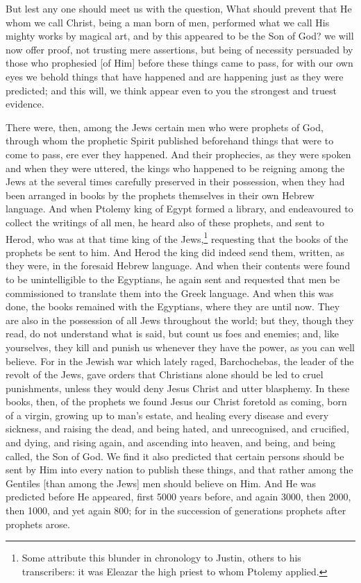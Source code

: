 
But lest any one should meet us with the question, What should prevent that He whom we call Christ, being a man born of men, performed what we call His mighty works by magical art, and by this appeared to be the Son of God? we will now offer proof, not trusting mere assertions, but being of necessity persuaded by those who prophesied [of Him] before these things came to pass, for with our own eyes we behold things that have happened and are happening just as  they were predicted; and this will, we think appear even to you the strongest and truest evidence.


There were, then, among the Jews certain men who were prophets of God, through whom the prophetic Spirit published beforehand things that were to come to pass, ere ever they happened. And their prophecies, as they were spoken and when they were uttered, the kings who happened to be reigning among the Jews at the several times carefully preserved in their possession, when they had been arranged in books by the prophets themselves in their own Hebrew language. And when Ptolemy king of Egypt formed a library, and endeavoured to collect the writings of all men, he heard also of these prophets, and sent to Herod, who was at that time king of the Jews,\footnote{Some attribute this blunder in chronology to Justin, others to his transcribers: it was Eleazar the high priest to whom Ptolemy applied.} requesting that the books of the prophets be sent to him. And Herod the king did indeed send them, written, as they were, in the foresaid Hebrew language. And when their contents were found to be unintelligible to the Egyptians, he again sent and requested that men be commissioned to translate them into the Greek language. And when this was done, the books remained with the Egyptians, where they are until now. They are also in the possession of all Jews throughout the world; but they, though they read, do not understand what is said, but count us foes and enemies; and, like yourselves, they kill and punish us whenever they have the power, as you can well believe. For in the Jewish war which lately raged, Barchochebas, the leader of the revolt of the Jews, gave orders that Christians alone should be led to cruel punishments, unless they would deny Jesus Christ and utter blasphemy. In these books, then, of the prophets we found Jesus our Christ foretold as coming, born of a virgin, growing up to man’s estate, and healing every disease and every sickness, and raising the dead, and being hated, and unrecognised, and crucified, and dying, and rising again, and ascending into heaven, and being, and being called, the Son of God. We find it also predicted that certain persons should be sent by Him into every nation to publish these things, and that rather among the Gentiles [than among the Jews] men should believe on Him. And He was predicted before He appeared, first 5000 years before, and again 3000, then 2000, then 1000, and yet again 800; for in the succession of generations prophets after prophets arose.

